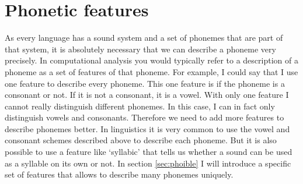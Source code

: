 \section{Phonetic features}
As every language has a sound system and a set of phonemes that are part of that system, it is absolutely necessary that we can describe a phoneme very precisely. In computational analysis you would typically refer to a description of a phoneme as a set of features of that phoneme. For example, I could say that I use one feature to describe every phoneme. This one feature is if the phoneme is a consonant or not. If it is not a consonant, it is a vowel. With only one feature I cannot really distinguish different phonemes. In this case, I can in fact only distinguish vowels and consonants. Therefore we need to add more features to describe phonemes better. In linguistics it is very common to use the vowel and consonant schemes described above to describe each phoneme. But it is also possible to use a feature like `syllabic' that tells us whether a sound can be used as a syllable on its own or not. In section \ref{sec:phoible}  I will introduce a specific set of features that allows to describe many phonemes uniquely. 


